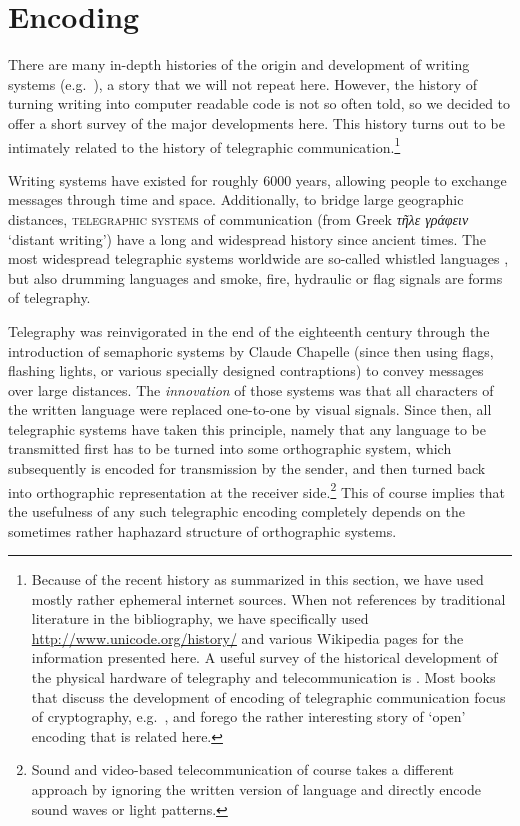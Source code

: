\chapter{Encoding}
\label{encoding}

There are many in-depth histories of the origin and development of writing systems (e.g.~\citet{Robinson1997,Powell2012}), a story that we will not repeat here. However, the history of turning writing into computer readable code is not so often told, so we decided to offer a short survey of the major developments here. This history turns out to be intimately related to the history of telegraphic communication.\footnote{Because of the recent history as summarized in this section, we have used mostly rather ephemeral internet sources. When not references by traditional literature in the bibliography, we have specifically used \url{http://www.unicode.org/history/} and various Wikipedia pages for the information presented here. A useful survey of the historical development of the physical hardware of telegraphy and telecommunication is \citet{Huurdeman2003}. Most books that discuss the development of encoding of telegraphic communication focus of cryptography, e.g.~\citet{Singh1999}, and forego the rather interesting story of `open' encoding that is related here.}

Writing systems have existed for roughly 6000 years, allowing people to exchange messages through time and space. Additionally, to bridge large geographic distances, \textsc{telegraphic systems} of communication (from Greek \emph{τῆλε γράφειν} `distant writing') have a long and widespread history since ancient times. The most widespread telegraphic systems worldwide are so-called whistled languages \citep{Meyer2015}, but also drumming languages \citep{Meyer_etal2012} and smoke, fire, hydraulic or flag signals are forms of telegraphy. 

Telegraphy was reinvigorated in the end of the eighteenth century through the introduction of semaphoric systems by Claude Chapelle (since then using flags, flashing lights, or various specially designed contraptions) to convey messages over large distances. The \textit{innovation} of those systems was that all characters of the written language were replaced one-to-one by visual signals. Since then, all telegraphic systems have taken this principle, namely that any language to be transmitted first has to be turned into some orthographic system, which subsequently is encoded for transmission by the sender, and then turned back into orthographic representation at the receiver side.\footnote{Sound and video-based telecommunication of course takes a different approach by ignoring the written version of language and directly encode sound waves or light patterns.} This of course implies that the usefulness of any such telegraphic encoding completely depends on the sometimes rather haphazard structure of orthographic systems.

